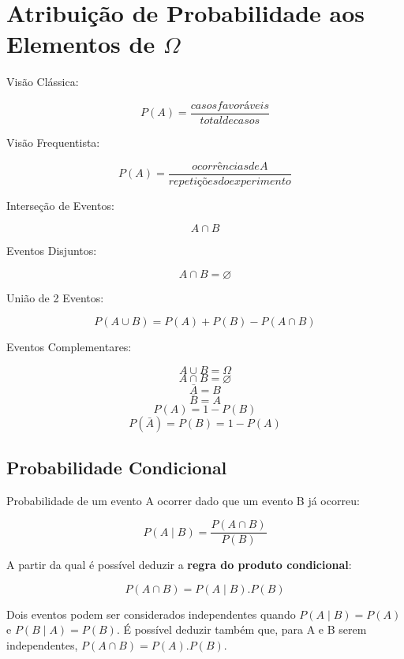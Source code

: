 \section{Atribuição de Probabilidade aos Elementos de \( \Omega \)}

Visão Clássica:

\[ P(A) = \frac{casos favoráveis}{total de casos} \]

Visão Frequentista:

\[ P(A) = \frac{ocorrências de A}{repetições do experimento} \]

Interseção de Eventos: 

\[ A \cap B \]

Eventos Disjuntos: 

\[ A \cap B = \varnothing \]

União de 2 Eventos:

\[ P(A \cup B) = P(A) + P(B) - P(A \cap B) \]  

Eventos Complementares:

\[ A \cup B = \Omega \] 
\[ A \cap B = \varnothing \]
\[ \bar{A} = B \]
\[ \bar{B} = A \]
\[ P(A) = 1 - P(B) \]
\[ P(\bar{A}) = P(B) = 1 - P(A) \]

\subsection{Probabilidade Condicional}

Probabilidade de um evento A ocorrer dado que um evento B já ocorreu:

\[ P(A \mid B) = \frac{P(A \cap B)}{P(B)} \]

A partir da qual é possível deduzir a \textbf{regra do produto condicional}:

\[ P(A \cap B) = P(A \mid B).P(B) \]

Dois eventos podem ser considerados independentes quando \( P(A \mid B) = P(A) \) e \( P(B \mid A) = P(B) \). É possível deduzir também que, para A e B serem independentes, \( P(A \cap B) = P(A).P(B) \). 

 